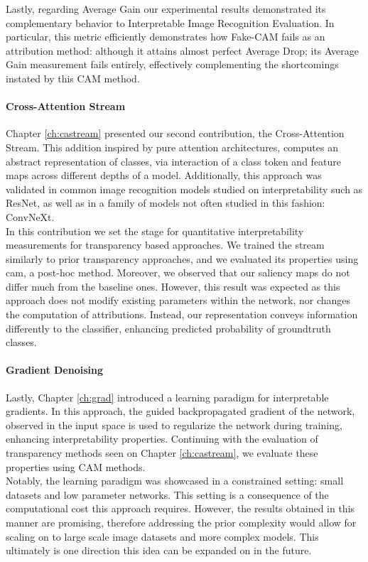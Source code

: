 \noindent Lastly, regarding Average Gain our experimental results demonstrated its complementary 
behavior to Interpretable Image Recognition Evaluation.  In particular, this metric efficiently 
demonstrates how Fake-CAM fails as an attribution method: although it attains almost perfect 
Average Drop; its Average Gain measurement fails entirely, effectively complementing the 
shortcomings instated by this CAM method.\\

\paragraph{Cross-Attention Stream}
\noindent Chapter \ref{ch:castream} presented our second contribution, the Cross-Attention Stream. 
This addition inspired by pure attention architectures, computes an abstract representation of 
classes, via interaction of a class token and feature maps across different depths of a model. 
Additionally, this approach was validated in common image recognition models studied on 
interpretability such as ResNet, as well as in a family of models not often studied in this fashion: 
ConvNeXt.\\

\noindent In this contribution we set the stage for quantitative interpretability measurements for 
transparency based approaches. We trained the stream similarly to prior transparency approaches, 
and we evaluated its properties using \gls{cam}, a post-hoc method. Moreover, we observed that our 
saliency maps do not differ much from the baseline ones. However, this result was expected as this 
approach does not modify existing parameters within the network, nor changes the computation of 
attributions. Instead, our representation conveys information differently to the classifier, 
enhancing predicted probability of groundtruth classes. \\

\paragraph{Gradient Denoising}
\noindent Lastly, Chapter \ref{ch:grad} introduced a learning paradigm for interpretable gradients. 
In this approach, the guided backpropagated gradient of the network, observed in the input space is 
used to regularize the network during training, enhancing interpretability properties. Continuing 
with the evaluation of transparency methods seen on Chapter \ref{ch:castream}, we evaluate these 
properties using CAM methods.\\

\noindent Notably, the learning paradigm was showcased in a constrained setting: small datasets and 
low parameter networks. This setting is a consequence of the computational cost this approach 
requires. However, the results obtained in this manner are promising, therefore addressing the 
prior complexity would allow for scaling on to large scale image datasets and more complex models. 
This ultimately is one direction this idea can be expanded on in the future. 